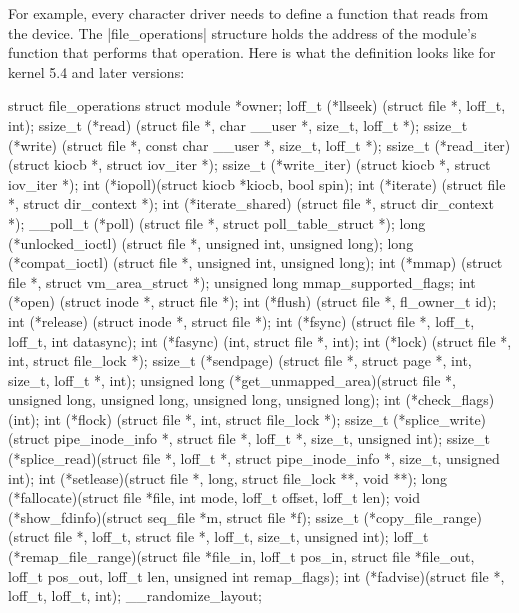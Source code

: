\documentclass[10pt, oneside]{book}
\begin{document}
For example, every character driver needs to define a function that reads from the device.
The \cpp|file_operations| structure holds the address of the module's function that performs that operation.
Here is what the definition looks like for kernel 5.4 and later versions:

\begin{code}
struct file_operations {
    struct module *owner;
    loff_t (*llseek) (struct file *, loff_t, int);
    ssize_t (*read) (struct file *, char __user *, size_t, loff_t *);
    ssize_t (*write) (struct file *, const char __user *, size_t, loff_t *);
    ssize_t (*read_iter) (struct kiocb *, struct iov_iter *);
    ssize_t (*write_iter) (struct kiocb *, struct iov_iter *);
    int (*iopoll)(struct kiocb *kiocb, bool spin);
    int (*iterate) (struct file *, struct dir_context *);
    int (*iterate_shared) (struct file *, struct dir_context *);
    __poll_t (*poll) (struct file *, struct poll_table_struct *);
    long (*unlocked_ioctl) (struct file *, unsigned int, unsigned long);
    long (*compat_ioctl) (struct file *, unsigned int, unsigned long);
    int (*mmap) (struct file *, struct vm_area_struct *);
    unsigned long mmap_supported_flags;
    int (*open) (struct inode *, struct file *);
    int (*flush) (struct file *, fl_owner_t id);
    int (*release) (struct inode *, struct file *);
    int (*fsync) (struct file *, loff_t, loff_t, int datasync);
    int (*fasync) (int, struct file *, int);
    int (*lock) (struct file *, int, struct file_lock *);
    ssize_t (*sendpage) (struct file *, struct page *, int, size_t, loff_t *, int);
    unsigned long (*get_unmapped_area)(struct file *, unsigned long, unsigned long, unsigned long, unsigned long);
    int (*check_flags)(int);
    int (*flock) (struct file *, int, struct file_lock *);
    ssize_t (*splice_write)(struct pipe_inode_info *, struct file *, loff_t *, size_t, unsigned int);
    ssize_t (*splice_read)(struct file *, loff_t *, struct pipe_inode_info *, size_t, unsigned int);
    int (*setlease)(struct file *, long, struct file_lock **, void **);
    long (*fallocate)(struct file *file, int mode, loff_t offset,
        loff_t len);
    void (*show_fdinfo)(struct seq_file *m, struct file *f);
    ssize_t (*copy_file_range)(struct file *, loff_t, struct file *,
        loff_t, size_t, unsigned int);
    loff_t (*remap_file_range)(struct file *file_in, loff_t pos_in,
             struct file *file_out, loff_t pos_out,
             loff_t len, unsigned int remap_flags);
    int (*fadvise)(struct file *, loff_t, loff_t, int);
} __randomize_layout;
\end{code}
\end{document}
